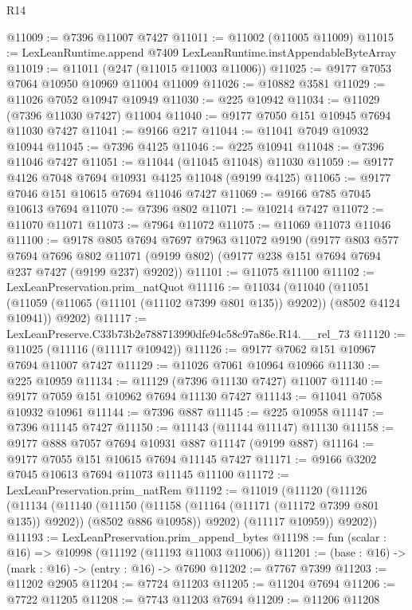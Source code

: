 \begin{lexlean}{R14}
\begin{coremodule}
@11009 := @7396 @11007 @7427
@11011 := @11002 (@11005 @11009)
@11015 := LexLeanRuntime.append @7409 LexLeanRuntime.instAppendableByteArray
@11019 := @11011 (@247 (@11015 @11003 @11006))
@11025 := @9177 @7053 @7064 @10950 @10969 @11004 @11009
@11026 := @10882 @3581
@11029 := @11026 @7052 @10947 @10949
@11030 := @225 @10942
@11034 := @11029 (@7396 @11030 @7427) @11004
@11040 := @9177 @7050 @151 @10945 @7694 @11030 @7427
@11041 := @9166 @217
@11044 := @11041 @7049 @10932 @10944
@11045 := @7396 @4125
@11046 := @225 @10941
@11048 := @7396 @11046 @7427
@11051 := @11044 (@11045 @11048) @11030
@11059 := @9177 @4126 @7048 @7694 @10931 @4125 @11048 (@9199 @4125)
@11065 := @9177 @7046 @151 @10615 @7694 @11046 @7427
@11069 := @9166 @785 @7045 @10613 @7694
@11070 := @7396 @802
@11071 := @10214 @7427
@11072 := @11070 @11071
@11073 := @7964 @11072
@11075 := @11069 @11073 @11046
@11100 := @9178
    @805
    @7694
    @7697
    @7963
    @11072
    @9190
    (@9177
      @803
      @577
      @7694
      @7696
      @802
      @11071
      (@9199 @802)
      (@9177 @238 @151 @7694 @7694 @237 @7427 (@9199 @237) @9202))
@11101 := @11075 @11100
@11102 := LexLeanPreservation.prim_natQuot
@11116 := @11034
    (@11040
      (@11051 (@11059 (@11065 (@11101 (@11102 @7399 @801 @135)) @9202)) (@8502 @4124 @10941))
      @9202)
@11117 := LexLeanPreserve.C33b73b2e788713990dfe94c58c97a86e.R14.__rel_73
@11120 := @11025 (@11116 (@11117 @10942))
@11126 := @9177 @7062 @151 @10967 @7694 @11007 @7427
@11129 := @11026 @7061 @10964 @10966
@11130 := @225 @10959
@11134 := @11129 (@7396 @11130 @7427) @11007
@11140 := @9177 @7059 @151 @10962 @7694 @11130 @7427
@11143 := @11041 @7058 @10932 @10961
@11144 := @7396 @887
@11145 := @225 @10958
@11147 := @7396 @11145 @7427
@11150 := @11143 (@11144 @11147) @11130
@11158 := @9177 @888 @7057 @7694 @10931 @887 @11147 (@9199 @887)
@11164 := @9177 @7055 @151 @10615 @7694 @11145 @7427
@11171 := @9166 @3202 @7045 @10613 @7694 @11073 @11145 @11100
@11172 := LexLeanPreservation.prim_natRem
@11192 := @11019
    (@11120
      (@11126
        (@11134
          (@11140
            (@11150 (@11158 (@11164 (@11171 (@11172 @7399 @801 @135)) @9202)) (@8502 @886 @10958))
            @9202)
          (@11117 @10959))
        @9202))
@11193 := LexLeanPreservation.prim_append_bytes
@11198 := fun (scalar : @16) => @10998 (@11192 (@11193 @11003 @11006))
@11201 := (base : @16) -> (mark : @16) -> (entry : @16) -> @7690
@11202 := @7767 @7399
@11203 := @11202 @2905
@11204 := @7724 @11203
@11205 := @11204 @7694
@11206 := @7722 @11205
@11208 := @7743 @11203 @7694
@11209 := @11206 @11208

\end{coremodule}
\end{lexlean}
